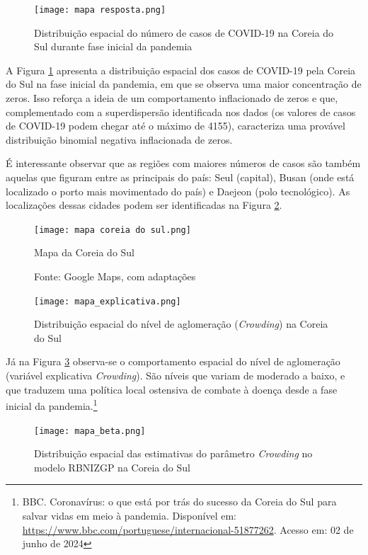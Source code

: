 \documentclass[12pt, a4paper, twoside]{report}
\numberwithin{equation}{section} %
\begin{document}
\begin{figure}[!htb]
    \centering
    \texttt{[image: mapa resposta.png]}
    \caption{Distribuição espacial do número de casos de COVID-19 na Coreia do Sul durante fase inicial da pandemia}
\label{fig:mapa resposta}
\end{figure}

A Figura \ref{fig:mapa resposta} apresenta a distribuição espacial dos casos de COVID-19 pela Coreia do Sul na fase inicial da pandemia, em que se observa uma maior concentração de zeros. Isso reforça a ideia de um comportamento inflacionado de zeros e que, complementado com a superdispersão identificada nos dados (os valores de casos de COVID-19 podem chegar até o máximo de 4155), caracteriza uma provável distribuição binomial negativa inflacionada de zeros. 

É interessante observar que as regiões com maiores números de casos são também aquelas que figuram entre as principais do país: Seul (capital), Busan (onde está localizado o porto mais movimentado do país) e Daejeon (polo tecnológico). As localizações dessas cidades podem ser identificadas na Figura \ref{fig:mapa Coreia do Sul}. 


\begin{figure}[!htb]
    \centering
    \texttt{[image: mapa coreia do sul.png]}
    \caption{Mapa da Coreia do Sul}
    \caption*{\footnotesize Fonte: Google Maps, com adaptações}
\label{fig:mapa Coreia do Sul}
\end{figure}

\begin{figure}[!htb]
    \centering
    \texttt{[image: mapa\_explicativa.png]}
    \caption{Distribuição espacial do nível de aglomeração (\textit{Crowding}) na Coreia do Sul}
\label{fig:mapa_explicativa}
\end{figure}


Já na Figura \ref{fig:mapa_explicativa} observa-se o comportamento espacial do nível de aglomeração (variável explicativa \textit{Crowding}). São níveis que variam de moderado a baixo, e que traduzem uma política local ostensiva de combate à doença desde a fase inicial da pandemia.\footnote{BBC. Coronavírus: o que está por trás do sucesso da Coreia do Sul para salvar vidas em meio à pandemia. Disponível em: \url{https://www.bbc.com/portuguese/internacional-51877262}. Acesso em: 02 de junho de 2024}

\begin{figure}[!htb]
    \centering
    \texttt{[image: mapa\_beta.png]}
    \caption{Distribuição espacial das estimativas do parâmetro \textit{Crowding} no modelo RBNIZGP na Coreia do Sul}
\label{fig:mapa_beta}
\end{figure}
\end{document}
